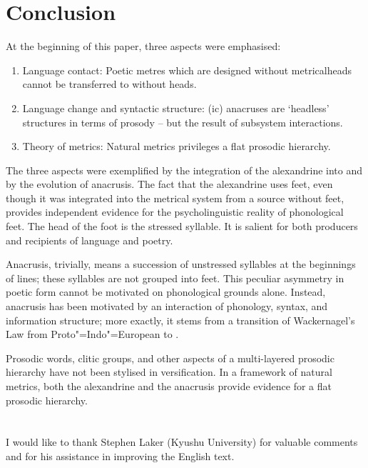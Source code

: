 \documentclass[output=paper
  ,nobabel
  ,uniformtopskip %
]{langscibook}
\begin{document}
\section{Conclusion}\label{sec-conclusion-noel}
At the beginning of this paper, three aspects were emphasised:

\begin{enumerate}
    \item Language contact: Poetic metres which are designed without metrical\linebreak heads cannot be transferred to  without heads. 

    \item Language change and syntactic structure: (ic) anacruses are `headless' structures in terms of prosody – but the result of subsystem interactions.

    \item Theory of metrics: Natural metrics privileges a flat prosodic hierarchy.
\end{enumerate}

\noindent
The three aspects were exemplified by the integration of the  alexandrine into  and by the evolution of  anacrusis. The fact that the  alexandrine uses feet, even though it was integrated into the  metrical system from a source without feet, provides independent evidence for the psycholinguistic reality of phonological feet. The head of the foot is the stressed syllable. It is salient for both producers and recipients of language and poetry.

Anacrusis, trivially, means a succession of unstressed syllables at the beginnings of lines; these syllables are not grouped into feet. This peculiar asymmetry in poetic form cannot be motivated on phonological grounds alone. Instead,  anacrusis has been motivated by an interaction of phonology, syntax, and information structure; more exactly, it stems from a transition of Wackernagel’s Law from Proto"=Indo"=European to .

Prosodic words, clitic groups, and other aspects of a multi-layered prosodic hierarchy have not been stylised in  versification. In a framework of natural metrics, both the  alexandrine and the  anacrusis provide evidence for a flat prosodic hierarchy.

\section*{\acknowledgmentsUS}

I would like to thank Stephen Laker (Kyushu University) for valuable comments and for his assistance in improving the English text.

{\sloppy
\printbibliography[heading=subbibliography,notkeyword=this]
}
\end{document}
